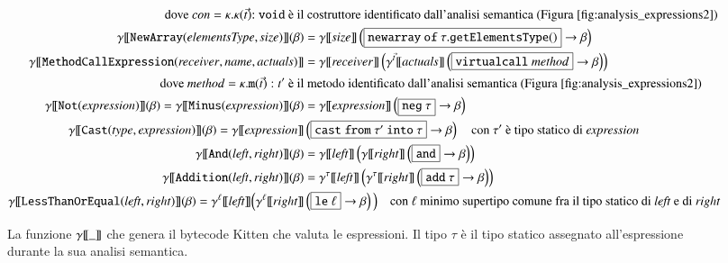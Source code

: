 \begin{figure}[t]
{\begin{align*}
  \text{dove $\mathit{con}=\kappa.\kappa(\vec{t})\mathtt{:void}$ \e il}&
  \text{ costruttore identificato dall'analisi semantica
        (Figura~\ref{fig:analysis_expressions2})}\\
  \gen{\mathtt{NewArray(\mathit{elementsType},\mathit{size})}}(\beta)
    &=\gen{\mathit{size}}
    \left(\fbox{$\mathtt{newarray\ of\ }\tau\mathtt{.getElementsType()}$}
    \to\beta\right)\\
  \gen{\mathtt{MethodCallExpression(\mathit{receiver},\mathit{name},
    \mathit{actuals})}}&=\gen{\mathit{receiver}}\left(
    \gentwo{\vec{t}}{\mathit{actuals}}
    \left(\fbox{$\mathtt{virtualcall}\ \mathit{method}$}
    \to\beta\right)\right)\\
  \text{dove $\mathit{method}=\kappa.\mathtt{m}(\vec{t}):t'$
        \`e il}&
  \text{ metodo identificato dall'analisi semantica
        (Figura~\ref{fig:analysis_expressions2})}\\
  \gen{\mathtt{Not(\mathit{expression})}}(\beta)=
    \gen{\mathtt{Minus(\mathit{expression})}}(\beta)&=
    \gen{\mathit{expression}}\left(
    \fbox{$\mathtt{neg\ }\tau$}\to\beta\right)\\
  \gen{\mathtt{Cast(\mathit{\mathit{type},\mathit{expression}})}}(\beta)=
      \gen{\mathit{expression}}&
        \left(\fbox{$\mathtt{cast\ from\ }\tau'\mathtt{\ into\ }\tau$}
        \to\beta\right)
  \quad\text{con $\tau'$ \e tipo statico di }\mathit{expression}\\
  \gen{\mathtt{And(\mathit{left},\mathit{right})}}(\beta)&=
    \gen{\mathit{left}}\left(
      \gen{\mathit{right}}\left(\fbox{$\mathtt{and}$}\to\beta\right)\right)\\
  \gen{\mathtt{Addition(\mathit{left},\mathit{right})}}(\beta)&=
    \gentwo{\tau}{\mathit{left}}\left(
      \gentwo{\tau}{\mathit{right}}\left(\fbox{$\mathtt{add}\ \tau$}
      \to\beta\right)\right)\\
  \gen{\mathtt{LessThanOrEqual(\mathit{left},\mathit{right})}}(\beta)=
    \gentwo{\ell}{\mathit{left}}\Big(
      \gentwo{\ell}{\mathit{right}}&\left(\fbox{$\mathtt{le}\ \ell$}
      \to\beta\right)\Big)\quad
  \text{con $\ell$ minimo supertipo comune fra il tipo statico di
    $\mathit{left}$ e di $\mathit{right}$}
\end{align*}
}
\caption{La funzione ${\gamma[\![{\_}]\!]}$ che genera il bytecode Kitten che valuta le espressioni. Il tipo $\tau$ \`e il tipo statico assegnato all'espressione durante la sua analisi semantica.}
  \label{fig:expressions_generation}
\end{figure}

